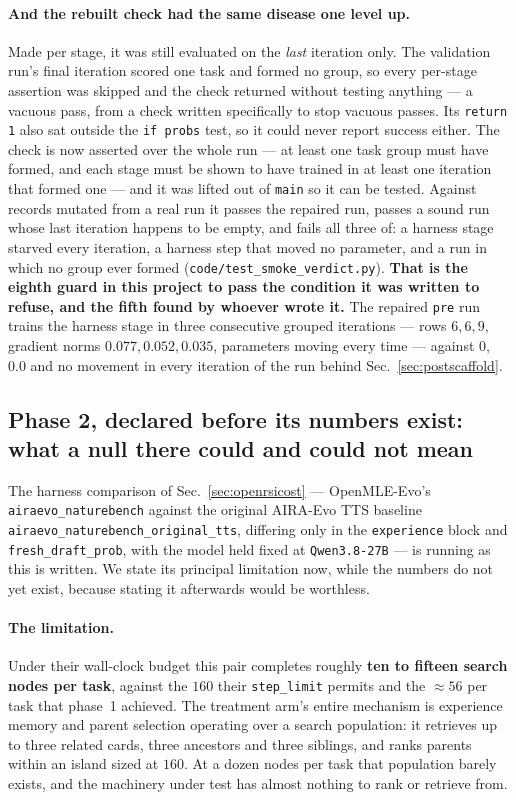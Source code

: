 \paragraph{And the rebuilt check had the same disease one level up.} Made per stage, it was
still evaluated on the \emph{last} iteration only. The validation run's final iteration scored
one task and formed no group, so every per-stage assertion was skipped and the check returned
without testing anything --- a vacuous pass, from a check written specifically to stop vacuous
passes. Its \texttt{return 1} also sat outside the \texttt{if probs} test, so it could never
report success either. The check is now asserted over the whole run --- at least one task group
must have formed, and each stage must be shown to have trained in at least one iteration that
formed one --- and it was lifted out of \texttt{main} so it can be tested. Against records
mutated from a real run it passes the repaired run, passes a sound run whose last iteration
happens to be empty, and fails all three of: a harness stage starved every iteration, a harness
step that moved no parameter, and a run in which no group ever formed
(\texttt{code/test\_smoke\_verdict.py}). \textbf{That is the eighth guard in this project to
pass the condition it was written to refuse, and the fifth found by whoever wrote it.} The
repaired \texttt{pre} run trains the harness stage in three consecutive grouped iterations ---
rows $6, 6, 9$, gradient norms $0.077, 0.052, 0.035$, parameters moving every time --- against
$0$, $0.0$ and no movement in every iteration of the run behind Sec.~\ref{sec:postscaffold}.

\subsection{Phase 2, declared before its numbers exist: what a null there could and could not
mean}
\label{sec:openrsiphase2pre}

The harness comparison of Sec.~\ref{sec:openrsicost} --- OpenMLE-Evo's
\texttt{airaevo\_naturebench} against the original AIRA-Evo TTS baseline
\texttt{airaevo\_naturebench\_original\_tts}, differing only in the \texttt{experience} block
and \texttt{fresh\_draft\_prob}, with the model held fixed at \texttt{Qwen3.8-27B} --- is
running as this is written. We state its principal limitation now, while the numbers do not
yet exist, because stating it afterwards would be worthless.

\paragraph{The limitation.}
Under their wall-clock budget this pair completes roughly \textbf{ten to fifteen search nodes
per task}, against the $160$ their \texttt{step\_limit} permits and the $\approx\!56$ per task
that phase~1 achieved. The treatment arm's entire mechanism is experience memory and
parent selection operating over a search population: it retrieves up to three related cards,
three ancestors and three siblings, and ranks parents within an island sized at $160$. At a
dozen nodes per task that population barely exists, and the machinery under test has almost
nothing to rank or retrieve from.

